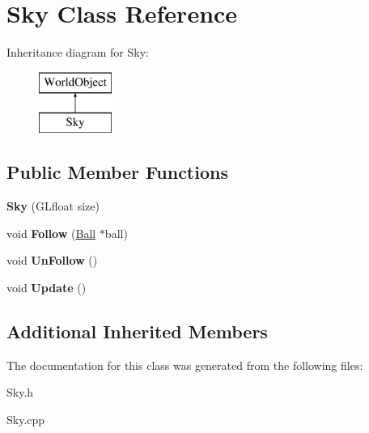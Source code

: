 \hypertarget{class_sky}{\section{Sky Class Reference}
\label{class_sky}
}
Inheritance diagram for Sky\+:\begin{figure}[H]
\begin{center}
\leavevmode
\includegraphics[height=2.000000cm]{class_sky}
\end{center}
\end{figure}
\subsection*{Public Member Functions}
\begin{DoxyCompactItemize}
\item 
\hypertarget{class_sky_a7969328d2fcbebdd7c7d456dc2a6cccd}{{\bfseries Sky} (G\+Lfloat size)}\label{class_sky_a7969328d2fcbebdd7c7d456dc2a6cccd}

\item 
\hypertarget{class_sky_afd761d9057943cc404448b3889e7e4f7}{void {\bfseries Follow} (\hyperlink{class_ball}{Ball} $\ast$ball)}\label{class_sky_afd761d9057943cc404448b3889e7e4f7}

\item 
\hypertarget{class_sky_ab2e87407bf02877b5375374990320cfc}{void {\bfseries Un\+Follow} ()}\label{class_sky_ab2e87407bf02877b5375374990320cfc}

\item 
\hypertarget{class_sky_a93a15559c1de7e0862d248933002620b}{void {\bfseries Update} ()}\label{class_sky_a93a15559c1de7e0862d248933002620b}

\end{DoxyCompactItemize}
\subsection*{Additional Inherited Members}


The documentation for this class was generated from the following files\+:\begin{DoxyCompactItemize}
\item 
Sky.\+h\item 
Sky.\+cpp\end{DoxyCompactItemize}
